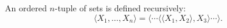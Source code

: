 An ordered $n$-tuple of sets is defined recursively:
$$\langle X_1, \ldots, X_n \rangle = \langle \cdots \langle \langle X_1, X_2 \rangle, X_3 \rangle \cdots \rangle.$$
